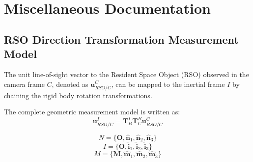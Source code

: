 \documentclass{article}
\newcommand{\vect}[1]{\mathbf{#1}}
\newcommand{\mat}[1]{\mathbf{#1}}
\newcommand{\TBC}{\mat{T}^B_{C}}
\newcommand{\TIB}{\mat{T}^I_{B}}
\newcommand{\uRSOcC}{\vect{u}^C_{RSO/C}}
\newcommand{\uRSOcI}{\vect{u}^I_{RSO/C}}
\begin{document}
\appendix
\section{Miscellaneous Documentation}

\subsection{RSO Direction Transformation Measurement Model}
The unit line-of-sight vector to the Resident Space Object (RSO) observed in the camera frame $C$, denoted as $\uRSOcC$, can be mapped to the inertial frame $I$ by chaining the rigid body rotation transformations.

The complete geometric measurement model is written as:
\begin{equation}
    \uRSOcI = \TIB \TBC \uRSOcC
\end{equation}

\begin{equation}
   \mathit{N} = \{ \mathbf{O}, \hat{\vect{n}}_1, \hat{\vect{n}}_2, \hat{\vect{n}}_3 \}
\end{equation}
\begin{equation}
    \mathit{I} = \{ \mathbf{O}, \hat{\vect{i}}_1, \hat{\vect{i}}_2, \hat{\vect{i}}_3 \}
\end{equation}
\begin{equation}
   \mathit{M} = \{ \mathbf{M}, \hat{\vect{m}}_1, \hat{\vect{m}}_2, \hat{\vect{m}}_3 \}
\end{equation}
\end{document}
